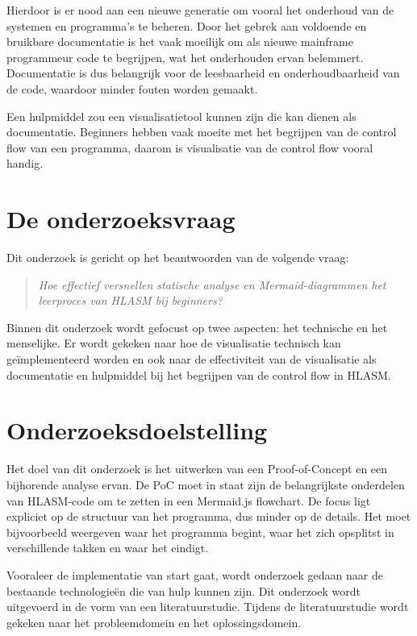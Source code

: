 Hierdoor is er nood aan een nieuwe generatie om vooral het onderhoud van de systemen en programma's te beheren. Door het gebrek aan voldoende en bruikbare documentatie is het vaak moeilijk om als nieuwe mainframe programmeur code te begrijpen, wat het onderhouden ervan belemmert. Documentatie is dus belangrijk voor de leesbaarheid en onderhoudbaarheid van de code, waardoor minder fouten worden gemaakt.

Een hulpmiddel zou een visualisatietool kunnen zijn die kan dienen als documentatie. Beginners hebben vaak moeite met het begrijpen van de control flow van een programma, daarom is visualisatie van de control flow vooral handig.

\section{De onderzoeksvraag}
\label{sec:onderzoeksvraag}

Dit onderzoek is gericht op het beantwoorden van de volgende vraag:

\begin{quote}
    \itshape
    Hoe effectief versnellen statische analyse en Mermaid-diagrammen het leerproces van HLASM bij beginners?
\end{quote}

Binnen dit onderzoek wordt gefocust op twee aspecten: het technische en het menselijke. Er wordt gekeken naar hoe de visualisatie technisch kan geïmplementeerd worden en ook naar de effectiviteit van de visualisatie als documentatie en hulpmiddel bij het begrijpen van de control flow in HLASM.  

\section{Onderzoeksdoelstelling}
\label{sec:Onderzoeksdoelstelling}

Het doel van dit onderzoek is het uitwerken van een Proof-of-Concept en een bijhorende analyse ervan. De PoC moet in staat zijn de belangrijkste onderdelen van HLASM-code om te zetten in een Mermaid.js flowchart. De focus ligt expliciet op de structuur van het programma, dus minder op de details. Het moet bijvoorbeeld weergeven waar het programma begint, waar het zich opsplitst in verschillende takken en waar het eindigt.  

Vooraleer de implementatie van start gaat, wordt onderzoek gedaan naar de bestaande technologieën die van hulp kunnen zijn. Dit onderzoek wordt uitgevoerd in de vorm van een literatuurstudie. Tijdens de literatuurstudie wordt gekeken naar het probleemdomein en het oplossingsdomein. 

